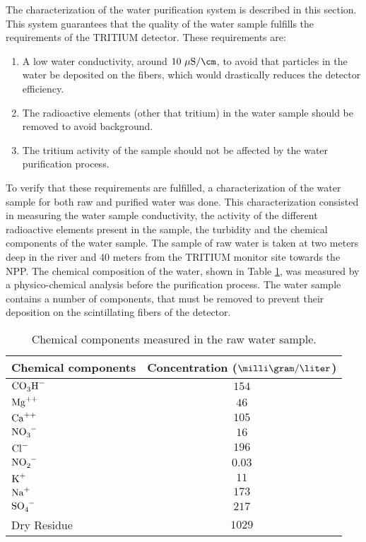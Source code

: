 The characterization of the water purification system is described in this section. This system guarantees that the quality of the water sample fulfills the requirements of the TRITIUM detector. These requirements are:

\begin{enumerate}
\item{} A low water conductivity, around $10~\mu\text{S}/\cm$, to avoid that particles in the water be deposited on the fibers, which would drastically reduces the detector efficiency.

\item{} The radioactive elements (other that tritium) in the water sample should be removed to avoid background.

\item{} The tritium activity of the sample should not be affected by the water purification process. 

\end{enumerate}

To verify that these requirements are fulfilled, a characterization of the water sample for both raw and purified water was done. This characterization consisted in measuring the water sample conductivity, the activity of the different radioactive elements present in the sample, the turbidity and the chemical components of the water sample. The sample of raw water is taken at two meters deep in the river and 40 meters from the TRITIUM monitor site towards the NPP. The chemical composition of the water, shown in Table \ref{tab:ChemicalComponentsRawWater}, was measured by a physico-chemical analysis before the purification process. The water sample contains a number of components, that must be removed to prevent their deposition on the scintillating fibers of the detector.

\begin{table}[htbp]
\centering{}%
\begin{tabular}{lc}
\toprule 
Chemical components & Concentration ($\milli\gram/\liter$) \tabularnewline
\midrule
\midrule 
$\ce{CO_{3}H^-}$ & $154$ \tabularnewline
$\ce{Mg^{++}}$ & $46$ \tabularnewline
$\ce{Ca^{++}}$ & $105$ \tabularnewline
$\ce{NO_{3}^-}$ & $16$ \tabularnewline
$\ce{Cl^-}$ & $196$ \tabularnewline
$\ce{NO_{2}^-}$ & $0.03$ \tabularnewline
$\ce{K^{+}}$ & $11$ \tabularnewline
$\ce{Na^{+}}$ & $173$ \tabularnewline
$\ce{SO_{4}^-}$ & $217$ \tabularnewline
Dry Residue & $1029$ \tabularnewline
\bottomrule
\end{tabular}
\caption{Chemical components measured in the raw water sample.}
\label{tab:ChemicalComponentsRawWater}
\end{table}

